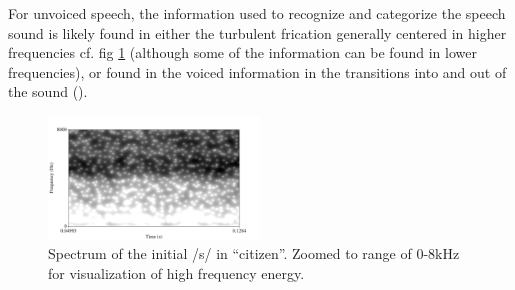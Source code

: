 \documentclass[dissertation,copyright]{uathesis}
\begin{document}
For unvoiced speech, the information used to recognize and categorize the speech sound is likely found in either the turbulent frication generally centered in higher frequencies cf. fig \ref{fig:spctgrm_s} (although some of the information can be found in lower frequencies), or found in the voiced information in the transitions into and out of the sound (\cite{story:10}).
%
\begin{figure}
\centering
  \includegraphics[width=0.5\textwidth]{figure/spctgrm_s.png}
  \caption{Spectrum of the initial /s/ in ``citizen''. Zoomed to range of 0-8kHz for visualization of high frequency energy.}
  \label{fig:spctgrm_s}
\end{figure}

\end{document}
